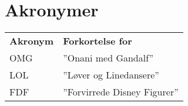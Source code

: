 \section*{Akronymer}
\begin{table}[h!]
    	\begin{tabular}{p{}|p{}}
    	\textbf{Akronym}&\textbf{Forkortelse for}
    	\\  	
    	OMG&''Onani med Gandalf''
    	\\
    	LOL&''Løver og Linedansere''
    	\\
    	FDF&''Forvirrede Disney Figurer''	
    	\\
    	\end{tabular}
\end{table}

